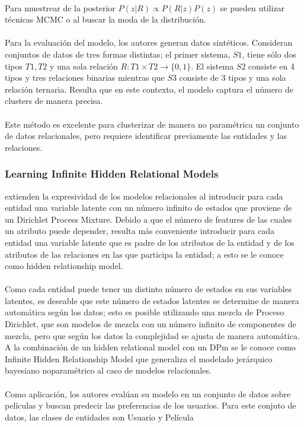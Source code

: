 \documentclass[11pt]{article}
\theoremstyle{plain}
\begin{document}
\\
Para muestrear de la posterior $P(z | R ) \propto P(R|z)P(z)$ se pueden utilizar técnicas MCMC o al buscar la moda de la distribución.\\
\\
Para la evaluación del modelo, los autores generan datos sintéticos. Consideran conjuntos de datos de tres formas distintas; el primer sistema, $S1$, tiene sólo dos tipos $T1, T2$ y una sola relación $R:T1 \times T2 \to \{0,1 \}$. El sistema $S2$ consiste en 4 tipos y tres relaciones binarias mientras que $S3$ consiste de 3 tipos y una sola relación ternaria. Resulta que en este contexto, el modelo captura el número de clusters de manera precisa. \\
\\
Este método es excelente para clusterizar de manera no paramétrica un conjunto de datos relacionales, pero requiere identificar previamente las entidades y las relaciones. 
\subsubsection{Learning Infinite Hidden Relational Models}
\cite{xu2006learning} extienden la expresividad de los modelos relacionales al introducir para cada entidad una variable latente con un número infinito de estados que proviene de un Dirichlet Process Mixture. Debido a que el número de features de las cuales un atributo puede depender, resulta más conveniente  introducir para cada entidad una variable latente que es padre de los atributos de la entidad y de los atributos de las relaciones en las que participa la entidad; a esto se le conoce como hidden relationship model.\\
\\
Como cada entidad puede tener un distinto número de estados en sus variables latentes, es deseable que este número de estados latentes se determine de manera automática según los datos; esto es posible utilizando una mezcla de Proceso Dirichlet, que son modelos de mezcla con un número infinito de componentes de mezcla, pero que según los datos la complejidad se ajusta de manera automática. A la combinación de un hidden relational model con un DPm se le conoce como Infinite Hidden Relationship Model que generaliza el modelado jerárquico bayesiano noparamétrico al caso de modelos relacionales.\\
\\
Como aplicación, los autores evalúan su modelo en un conjunto de datos sobre películas y buscan predecir las preferencias de los usuarios. Para este conjuto de datos, las clases de entidades son Usuario y Película
\end{document}
